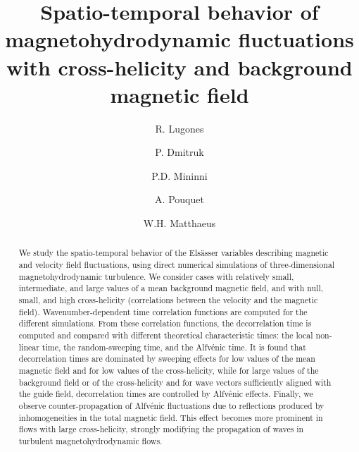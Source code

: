 \documentclass[aip,pop,reprint,amsmath,amssymb,floatfix]{revtex4-1}
\begin{document}
\title{Spatio-temporal behavior of magnetohydrodynamic fluctuations with cross-helicity and background magnetic field}

\author{R. Lugones}
  
\author{P. Dmitruk}
  
\author{P.D. Mininni}

\author{A. Pouquet}

\author{W.H. Matthaeus}


\begin{abstract}
  We study the spatio-temporal behavior of the Els\"asser variables
  describing magnetic and velocity field fluctuations, using direct
  numerical simulations of three-dimensional magnetohydrodynamic
  turbulence. We consider cases with relatively small, intermediate,
  and large values of a mean background magnetic field, and with null,
  small, and high cross-helicity (correlations between the velocity
  and the magnetic field). Wavenumber-dependent time correlation
  functions are computed for the different simulations. From these
  correlation functions, the decorrelation time is computed and
  compared with different theoretical characteristic times: the local
  non-linear time, the random-sweeping time, and the Alfv\'enic
  time. It is found that decorrelation times are dominated by sweeping
  effects for low values of the mean magnetic field and for low values
  of the cross-helicity, while for large values of the background
  field or of the cross-helicity and for wave vectors sufficiently
  aligned with the guide field, decorrelation times are controlled by
  Alfv\'enic effects. Finally, we observe counter-propagation of
  Alfv\'enic fluctuations due to reflections produced by
  inhomogeneities in the total magnetic field. This effect becomes
  more prominent in flows with large cross-helicity, strongly
  modifying the propagation of waves in turbulent magnetohydrodynamic
  flows.
\end{abstract}
\end{document}
